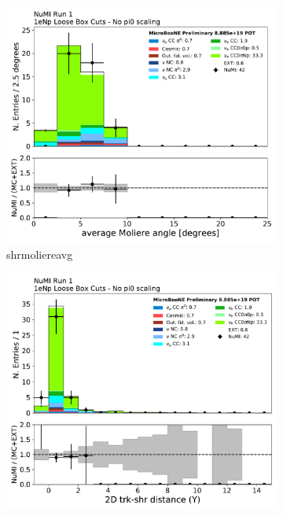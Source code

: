 \begin{figure}[H]
    \centering
    \begin{subfigure}{0.3\textwidth}
    \includegraphics[width=1.0\textwidth]{Sidebands/Figures/NuMI/1eNp/shrmoliereavg.pdf}
    \caption{shrmoliereavg}
    \end{subfigure}
    \begin{subfigure}{0.3\textwidth}
    \includegraphics[width=1.0\textwidth]{Sidebands/Figures/NuMI/1eNp/trkshrhitdist2.pdf}

\end{subfigure}
\end{figure}
